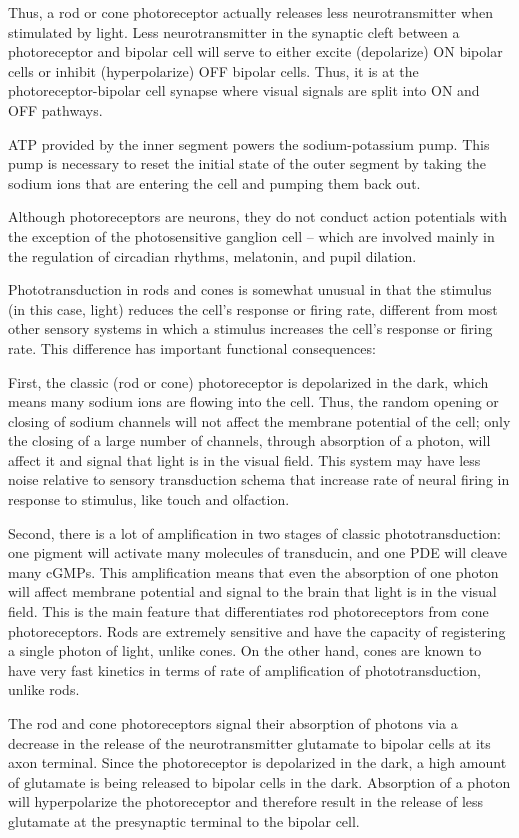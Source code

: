Thus, a rod or cone photoreceptor actually releases less neurotransmitter when stimulated by light. Less neurotransmitter in the synaptic cleft between a photoreceptor and bipolar cell will serve to either excite (depolarize) ON bipolar cells or inhibit (hyperpolarize) OFF bipolar cells. Thus, it is at the photoreceptor-bipolar cell synapse where visual signals are split into ON and OFF pathways.

ATP provided by the inner segment powers the sodium-potassium pump. This pump is necessary to reset the initial state of the outer segment by taking the sodium ions that are entering the cell and pumping them back out.

Although photoreceptors are neurons, they do not conduct action potentials with the exception of the photosensitive ganglion cell -- which are involved mainly in the regulation of circadian rhythms, melatonin, and pupil dilation.

Phototransduction in rods and cones is somewhat unusual in that the stimulus (in this case, light) reduces the cell's response or firing rate, different from most other sensory systems in which a stimulus increases the cell's response or firing rate. This difference has important functional consequences:

First, the classic (rod or cone) photoreceptor is depolarized in the dark, which means many sodium ions are flowing into the cell. Thus, the random opening or closing of sodium channels will not affect the membrane potential of the cell; only the closing of a large number of channels, through absorption of a photon, will affect it and signal that light is in the visual field. This system may have less noise relative to sensory transduction schema that increase rate of neural firing in response to stimulus, like touch and olfaction.

Second, there is a lot of amplification in two stages of classic phototransduction: one pigment will activate many molecules of transducin, and one PDE will cleave many cGMPs. This amplification means that even the absorption of one photon will affect membrane potential and signal to the brain that light is in the visual field. This is the main feature that differentiates rod photoreceptors from cone photoreceptors. Rods are extremely sensitive and have the capacity of registering a single photon of light, unlike cones. On the other hand, cones are known to have very fast kinetics in terms of rate of amplification of phototransduction, unlike rods.

The rod and cone photoreceptors signal their absorption of photons via a decrease in the release of the neurotransmitter glutamate to bipolar cells at its axon terminal. Since the photoreceptor is depolarized in the dark, a high amount of glutamate is being released to bipolar cells in the dark. Absorption of a photon will hyperpolarize the photoreceptor and therefore result in the release of less glutamate at the presynaptic terminal to the bipolar cell.

